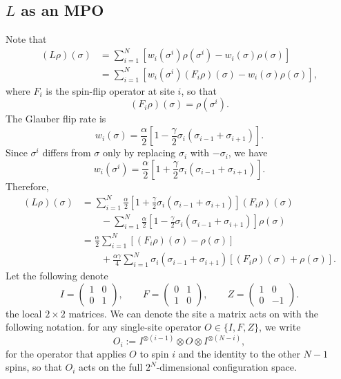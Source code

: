 \documentclass[12pt]{article}
\theoremstyle{definition}
\theoremstyle{remark}
\begin{document}
\subsection{$L$ as an MPO}\label{sec:glauber-mpo}
Note that 
\begin{align*}
(L\rho)(\sigma)
&= \sum_{i=1}^N
\left[
w_i(\sigma^i)\rho(\sigma^i)
-
w_i(\sigma)\rho(\sigma)
\right] \\[4pt]
&= \sum_{i=1}^N
\left[
w_i(\sigma^i)(F_i\rho)(\sigma)
-
w_i(\sigma)\rho(\sigma)
\right],
\end{align*}
where \(F_i\) is the spin-flip operator at site \(i\), so that
\[
(F_i\rho)(\sigma)=\rho(\sigma^i).
\]
The Glauber flip rate is
\[
w_i(\sigma)
=
\frac{\alpha}{2}
\left[
1-\frac{\gamma}{2}\sigma_i(\sigma_{i-1}+\sigma_{i+1})
\right].
\]
Since \(\sigma^i\) differs from \(\sigma\) only by replacing \(\sigma_i\) with \(-\sigma_i\), we have
\[
w_i(\sigma^i)
=
\frac{\alpha}{2}
\left[
1+\frac{\gamma}{2}\sigma_i(\sigma_{i-1}+\sigma_{i+1})
\right].
\]
Therefore,
\begin{align*}
(L\rho)(\sigma)
&=
\sum_{i=1}^N
\frac{\alpha}{2}
\left[
1+\frac{\gamma}{2}\sigma_i(\sigma_{i-1}+\sigma_{i+1})
\right]
(F_i\rho)(\sigma) \\[4pt]
&\qquad
-
\sum_{i=1}^N
\frac{\alpha}{2}
\left[
1-\frac{\gamma}{2}\sigma_i(\sigma_{i-1}+\sigma_{i+1})
\right]
\rho(\sigma) \\[4pt]
&=
\frac{\alpha}{2}
\sum_{i=1}^N
\left[
(F_i\rho)(\sigma)-\rho(\sigma)
\right] \\[4pt]
&\qquad
+
\frac{\alpha\gamma}{4}
\sum_{i=1}^N
\sigma_i(\sigma_{i-1}+\sigma_{i+1})
\left[
(F_i\rho)(\sigma)+\rho(\sigma)
\right].
\end{align*}
Let the following denote 
\[
I=
\begin{pmatrix}
1&0\\
0&1
\end{pmatrix},
\qquad
F=
\begin{pmatrix}
0&1\\
1&0
\end{pmatrix},
\qquad
Z=
\begin{pmatrix}
1&0\\
0&-1
\end{pmatrix}.
\]
the local \(2\times 2\) matrices. We can denote the site a matrix acts on with the following notation. for any single-site operator \(O \in \{I, F, Z\}\), we write
\[
O_i := I^{\otimes(i-1)} \otimes O \otimes I^{\otimes(N-i)},
\]
for the operator that applies \(O\) to spin \(i\) and the identity to the other \(N-1\) spins, so that \(O_i\) acts on the full \(2^N\)-dimensional configuration space. 
\end{document}
